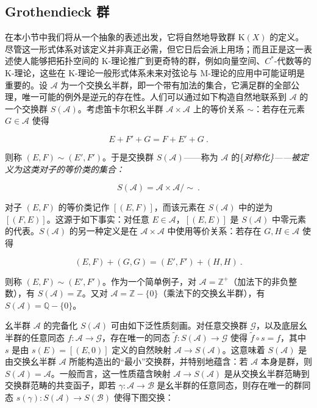 \documentclass[11pt,a4paper]{ctexart}
\newcommand{\SrcRange}[2]{\marginpar{\raggedright\footnotesize 原文 p.#1}}
\begin{document}
\SrcRange{12}{12}
\subsection{Grothendieck 群}\label{grothendieck-ux7fa4}

在本小节中我们将从一个抽象的表述出发，它将自然地导致群 \({\mathrm K}(X)\) 的定义。尽管这一形式体系对该定义并非真正必需，但它日后会派上用场；而且正是这一表述使人能够把拓扑空间的 K-理论推广到更奇特的群，例如向量空间、\(C^*\)-代数等的 K-理论，这些在 K-理论一般形式体系未来对弦论与 M-理论的应用中可能证明是重要的。设 \({\mathcal A}\) 为一个交换幺半群，即一个带有加法的集合，它满足群的全部公理，唯一可能的例外是逆元的存在性。人们可以通过如下构造自然地联系到 \({\mathcal A}\) 的一个交换群 \(S({\mathcal A})\)。考虑笛卡尔积幺半群 \({\mathcal A}\times{\mathcal A}\) 上的等价关系 \(\sim\)：若存在元素 \(G\in {\mathcal A}\) 使得

\[E+F'+G=F+E'+G\ .\]

则称 \((E,F)\sim (E', F')\)。于是交换群 \(S({\mathcal A})\)------称为 \({\mathcal A}\) 的\{\it 对称化\}------被定义为这类对子的等价类的集合：

\[S({\mathcal A})={\mathcal A}\times{\mathcal A}/\sim\ .\]

对子 \((E,F)\) 的等价类记作 \([(E,F)]\)，而该元素在 \(S({\mathcal A})\) 中的逆为 \([(F,E)]\)。这源于如下事实：对任意 \(E\in {\mathcal A}\)，\([(E,E)]\) 是 \(S({\mathcal A})\) 中零元素的代表。\(S({\mathcal A})\) 的另一种定义是在 \({\mathcal A}\times{\mathcal A}\) 中使用等价关系：若存在 \(G,H\in{\mathcal A}\) 使得

\[(E,F)+(G,G)=(E',F')+(H,H)\ .\]

则称 \((E,F)\sim (E',F')\)。作为一个简单例子，对 \({\mathcal A}={\mathbb{Z}}^+\)（加法下的非负整数），有 \(S({\mathcal A})={\mathbb{Z}}\)。又对 \({\mathcal A}={\mathbb{Z}}-\{0\}\)（乘法下的交换幺半群），有 \(S({\mathcal A})={\mathbb{Q}} -\{0\}\)。

幺半群 \({\mathcal A}\) 的完备化 \(S({\mathcal A})\) 可由如下泛性质刻画。对任意交换群 \(\mathcal G\)，以及底层幺半群的任意同态 \(f:{\mathcal A}\to{\mathcal G}\)，存在唯一的同态 \(\tilde{f}:S({\mathcal A})\to\mathcal G\) 使得 \(\tilde{f}\circ s=f\)，其中 \(s\) 是由 \(s(E)=[(E,0)]\) 定义的自然映射 \({\mathcal A}\rightarrow S({\mathcal A})\)。这意味着 \(S({\mathcal A})\) 是由交换幺半群 \({\mathcal A}\) 所能构造出的``最小''交换群，并特别地蕴含：若 \(\mathcal A\) 本身是群，则 \(S({\mathcal A})=\mathcal A\)。一般而言，这一性质蕴含映射 \({\mathcal A}\rightarrow S({\mathcal A})\) 是从交换幺半群范畴到交换群范畴的共变函子，即若 \(\gamma: {\mathcal A}\rightarrow {\mathcal B}\) 是幺半群的任意同态，则存在唯一的群同态 \(s(\gamma):S({\mathcal A})\rightarrow S({\mathcal B})\) 使得下图交换：
\end{document}
